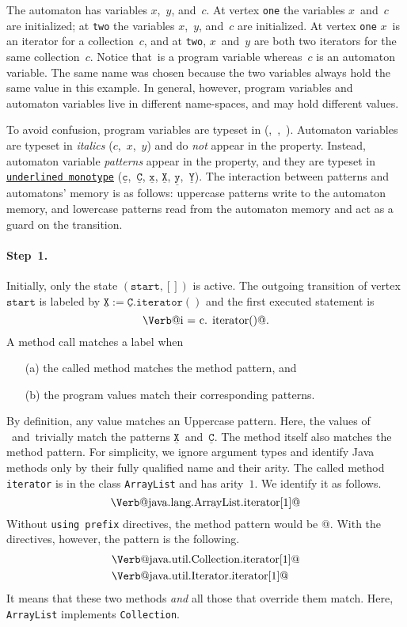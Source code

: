 \documentclass{sigplanconf}[10pt] %
\makeatletter
\newcommand{\pattern}[1]{\ensuremath{\mathtt{\underline{#1}}}}
\newcommand{\start}{\ensuremath{\mathtt{start}}\xspace}
\newcommand{\verbline}[2][]{\[\text{\Verb@#2@}#1\]}
\newtheorem{notation}{Notation}
\makeatother
\begin{document}
The automaton has variables $x$,~$y$, and~$c$.
At vertex \texttt{one} the variables $x$~and~$c$ are initialized;
at \texttt{two} the variables $x$,~$y$, and~$c$ are initialized.
At vertex \texttt{one} $x$~is an iterator for a collection~$c$, and
at \texttt{two}, $x$~and~$y$ are both two iterators for the same collection~$c$.
Notice that~\Verb@c@ is a program variable whereas~$c$ is an automaton variable.
The same name was chosen because the two variables always hold the same value in this example.
In general, however, program variables and automaton variables live in different name-spaces, and may hold different values.

To avoid confusion, program variables are typeset in \Verb@monotype@ (\Verb@c@,~\Verb@i@,~\Verb@j@).
Automaton variables are typeset in \textit{italics} ($c$,~$x$,~$y$) and 
 do \emph{not} appear in the property.
Instead, automaton variable \emph{patterns} appear in the property, and they are typeset in \texttt{\underline{underlined monotype}} (\pattern c,~\pattern C, \pattern x, \pattern X, \pattern y,~\pattern Y).
%
The interaction between patterns and automatons' memory is as follows: uppercase patterns write to the automaton memory, and lowercase patterns read from the automaton memory and act as a guard on the transition.

\paragraph{Step~1.}

Initially, only the state $(\start,[])$ is active.
The outgoing transition of vertex \start is labeled by $\pattern X:=\pattern{C}.\mathtt{iterator}()$ and the first executed statement is \verbline[.]{i = c.\PY{n+na}{iterator}()}
A method call matches a label when
\begin{itemize}
\item[(a)] the called method matches the method pattern, and
\item[(b)] the program values match their corresponding patterns.
\end{itemize}
By definition, any value matches an Uppercase pattern.
Here, the values of \Verb@i@~and~\Verb@c@ trivially match the patterns \pattern X~and~\pattern C.
The method itself also matches the method pattern.
For simplicity, we ignore argument types and identify Java methods only by their fully qualified name and their arity.
The called method \texttt{iterator} is in the class \texttt{ArrayList} and has arity~$1$.
We identify it as follows.
\verbline{java.lang.ArrayList.iterator[1]}
Without \texttt{using prefix} directives, the method pattern would be \Verb@iterator[1]@.
With the directives, however, the pattern is the following.
\begin{align*}
&\text{\Verb@java.util.Collection.iterator[1]@} \\
&\text{\Verb@java.util.Iterator.iterator[1]@}
\end{align*}
It means that these two methods \emph{and} all those that override them match.
Here, \texttt{ArrayList} implements \texttt{Collection}.
\end{document}
